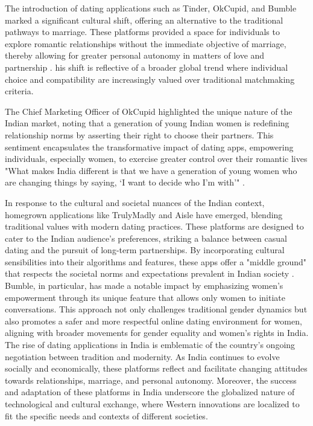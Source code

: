 The introduction of dating applications such as Tinder, OkCupid, and Bumble marked a significant cultural shift, offering an alternative to the traditional pathways to marriage. These platforms provided a space for individuals to explore romantic relationships without the immediate objective of marriage, thereby allowing for greater personal autonomy in matters of love and partnership \cite{Das_2019}. his shift is reflective of a broader global trend where individual choice and compatibility are increasingly valued over traditional matchmaking criteria.

The Chief Marketing Officer of OkCupid highlighted the unique nature of the Indian market, noting that a generation of young Indian women is redefining relationship norms by asserting their right to choose their partners. This sentiment encapsulates the transformative impact of dating apps, empowering individuals, especially women, to exercise greater control over their romantic lives "What makes India different is that we have a generation of young women who are changing things by saying, ‘I want to decide who I’m with’" \cite{Forbes_2020}.

In response to the cultural and societal nuances of the Indian context, homegrown applications like TrulyMadly and Aisle have emerged, blending traditional values with modern dating practices. These platforms are designed to cater to the Indian audience's preferences, striking a balance between casual dating and the pursuit of long-term partnerships. By incorporating cultural sensibilities into their algorithms and features, these apps offer a "middle ground" that respects the societal norms and expectations prevalent in Indian society \cite{Forbes_2020}. Bumble, in particular, has made a notable impact by emphasizing women's empowerment through its unique feature that allows only women to initiate conversations.\cite{noauthor_bumble_nodate} This approach not only challenges traditional gender dynamics but also promotes a safer and more respectful online dating environment for women, aligning with broader movements for gender equality and women's rights in India. The rise of dating applications in India is emblematic of the country's ongoing negotiation between tradition and modernity. As India continues to evolve socially and economically, these platforms reflect and facilitate changing attitudes towards relationships, marriage, and personal autonomy. Moreover, the success and adaptation of these platforms in India underscore the globalized nature of technological and cultural exchange, where Western innovations are localized to fit the specific needs and contexts of different societies.

